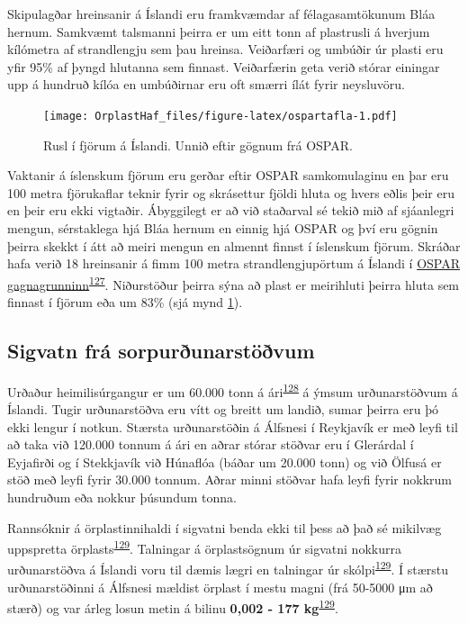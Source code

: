 \documentclass[icelandic,]{book}
\begin{document}
Skipulagðar hreinsanir á Íslandi eru framkvæmdar af félagasamtökunum Bláa hernum. Samkvæmt talsmanni þeirra er um eitt tonn af plastrusli á hverjum kílómetra af strandlengju sem þau hreinsa. Veiðarfæri og umbúðir úr plasti eru yfir 95\% af þyngd hlutanna sem finnast. Veiðarfærin geta verið stórar einingar upp á hundruð kílóa en umbúðirnar eru oft smærri ílát fyrir neysluvöru.

\begin{figure}
\centering
\texttt{[image: OrplastHaf\_files/figure-latex/ospartafla-1.pdf]}
\caption{\label{fig:ospartafla}Rusl í fjörum á Íslandi. Unnið eftir gögnum frá OSPAR.}
\end{figure}

Vaktanir á íslenskum fjörum eru gerðar eftir OSPAR samkomulaginu en þar eru 100 metra fjörukaflar teknir fyrir og skrásettur fjöldi hluta og hvers eðlis þeir eru en þeir eru ekki vigtaðir. Ábyggilegt er að við staðarval sé tekið mið af sjáanlegri mengun, sérstaklega hjá Bláa hernum en einnig hjá OSPAR og því eru gögnin þeirra skekkt í átt að meiri mengun en almennt finnst í íslenskum fjörum. Skráðar hafa verið 18 hreinsanir á fimm 100 metra strandlengjupörtum á Íslandi í \href{http://www.mcsuk.org/ospar/map}{OSPAR gagnagrunninn}\textsuperscript{\protect\hyperlink{ref-ospar2019}{127}}. Niðurstöður þeirra sýna að plast er meirihluti þeirra hluta sem finnast í fjörum eða um 83\% (sjá mynd \ref{fig:ospartafla}).

\hypertarget{sigvatn-fra-sorpurunarstovum}{%
\subsection*{Sigvatn frá sorpurðunarstöðvum}\label{sigvatn-fra-sorpurunarstovum}}

Urðaður heimilisúrgangur er um 60.000 tonn á ári\textsuperscript{\protect\hyperlink{ref-tollurinn2}{128}} á ýmsum urðunarstöðvum á Íslandi. Tugir urðunarstöðva eru vítt og breitt um landið, sumar þeirra eru þó ekki lengur í notkun. Stærsta urðunarstöðin á Álfsnesi í Reykjavík er með leyfi til að taka við 120.000 tonnum á ári en aðrar stórar stöðvar eru í Glerárdal í Eyjafirði og í Stekkjavík við Húnaflóa (báðar um 20.000 tonn) og við Ölfusá er stöð með leyfi fyrir 30.000 tonnum. Aðrar minni stöðvar hafa leyfi fyrir nokkrum hundruðum eða nokkur þúsundum tonna.

Rannsóknir á örplastinnihaldi í sigvatni benda ekki til þess að það sé mikilvæg uppspretta örplasts\textsuperscript{\protect\hyperlink{ref-Praagh1277395}{129}}. Talningar á örplastsögnum úr sigvatni nokkurra urðunarstöðva á Íslandi voru til dæmis lægri en talningar úr skólpi\textsuperscript{\protect\hyperlink{ref-Praagh1277395}{129}}. Í stærstu urðunarstöðinni á Álfsnesi mældist örplast í mestu magni (frá 50-5000 μm að stærð) og var árleg losun metin á bilinu \textbf{0,002 - 177 kg}\textsuperscript{\protect\hyperlink{ref-Praagh1277395}{129}}.
\end{document}
